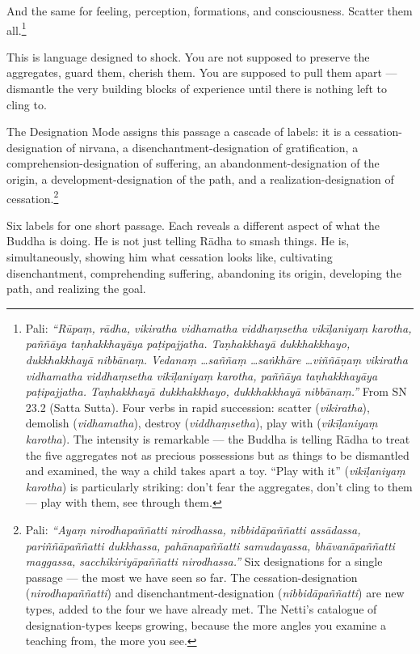 And the same for feeling, perception, formations, and consciousness. Scatter them all.\footnote{Pali: \textit{``Rūpaṃ, rādha, vikiratha vidhamatha viddhaṃsetha vikīḷaniyaṃ karotha, paññāya taṇhakkhayāya paṭipajjatha. Taṇhakkhayā dukkhakkhayo, dukkhakkhayā nibbānaṃ. Vedanaṃ \ldots saññaṃ \ldots saṅkhāre \ldots viññāṇaṃ vikiratha vidhamatha viddhaṃsetha vikīḷaniyaṃ karotha, paññāya taṇhakkhayāya paṭipajjatha. Taṇhakkhayā dukkhakkhayo, dukkhakkhayā nibbānaṃ.''} From SN 23.2 (Satta Sutta). Four verbs in rapid succession: scatter (\textit{vikiratha}), demolish (\textit{vidhamatha}), destroy (\textit{viddhaṃsetha}), play with (\textit{vikīḷaniyaṃ karotha}). The intensity is remarkable --- the Buddha is telling Rādha to treat the five aggregates not as precious possessions but as things to be dismantled and examined, the way a child takes apart a toy. ``Play with it'' (\textit{vikīḷaniyaṃ karotha}) is particularly striking: don't fear the aggregates, don't cling to them --- play with them, see through them.}

This is language designed to shock. You are not supposed to preserve the aggregates, guard them, cherish them. You are supposed to pull them apart --- dismantle the very building blocks of experience until there is nothing left to cling to.

The Designation Mode assigns this passage a cascade of labels: it is a cessation-designation of nirvana, a disenchantment-designation of gratification, a comprehension-designation of suffering, an abandonment-designation of the origin, a development-designation of the path, and a realization-designation of cessation.\footnote{Pali: \textit{``Ayaṃ nirodhapaññatti nirodhassa, nibbidāpaññatti assādassa, pariññāpaññatti dukkhassa, pahānapaññatti samudayassa, bhāvanāpaññatti maggassa, sacchikiriyāpaññatti nirodhassa.''} Six designations for a single passage --- the most we have seen so far. The cessation-designation (\textit{nirodhapaññatti}) and disenchantment-designation (\textit{nibbidāpaññatti}) are new types, added to the four we have already met. The Netti's catalogue of designation-types keeps growing, because the more angles you examine a teaching from, the more you see.}

Six labels for one short passage. Each reveals a different aspect of what the Buddha is doing. He is not just telling Rādha to smash things. He is, simultaneously, showing him what cessation looks like, cultivating disenchantment, comprehending suffering, abandoning its origin, developing the path, and realizing the goal.

